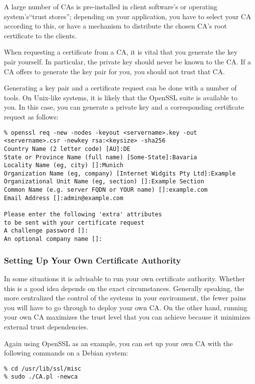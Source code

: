 A large number of CAs is pre-installed in client software's or
operating system's``trust stores''; depending on your application, you
have to select your CA according to this, or have a mechanism to
distribute the chosen CA's root certificate to the clients.

When requesting a certificate from a CA, it is vital that you generate the
key pair yourself.  In particular, the private key should never be known to
the CA.  If a CA offers to generate the key pair for you, you should not
trust that CA.

Generating a key pair and a certificate request can be done with a number of
tools.  On Unix-like systems, it is likely that the OpenSSL suite is available
to you.  In this case, you can generate a private key and a corresponding
certificate request as follows:

\begin{lstlisting}
% openssl req -new -nodes -keyout <servername>.key -out <servername>.csr -newkey rsa:<keysize> -sha256
Country Name (2 letter code) [AU]:DE
State or Province Name (full name) [Some-State]:Bavaria
Locality Name (eg, city) []:Munich
Organization Name (eg, company) [Internet Widgits Pty Ltd]:Example
Organizational Unit Name (eg, section) []:Example Section
Common Name (e.g. server FQDN or YOUR name) []:example.com
Email Address []:admin@example.com

Please enter the following 'extra' attributes
to be sent with your certificate request
A challenge password []:
An optional company name []:
\end{lstlisting}

\subsubsection{Setting Up Your Own Certificate Authority}
\label{sec:setupownca}
In some situations it is advisable to run your own certificate authority.
Whether this is a good idea depends on the exact circumstances.  Generally
speaking, the more centralized the control of the systems in your
environment, the fewer pains you will have to go through to deploy your own
CA.  On the other hand, running your own CA maximizes the trust level that
you can achieve because it minimizes external trust dependencies.

Again using OpenSSL as an example, you can set up your own CA with the
following commands on a Debian system:

\begin{lstlisting}
% cd /usr/lib/ssl/misc
% sudo ./CA.pl -newca
\end{lstlisting}

